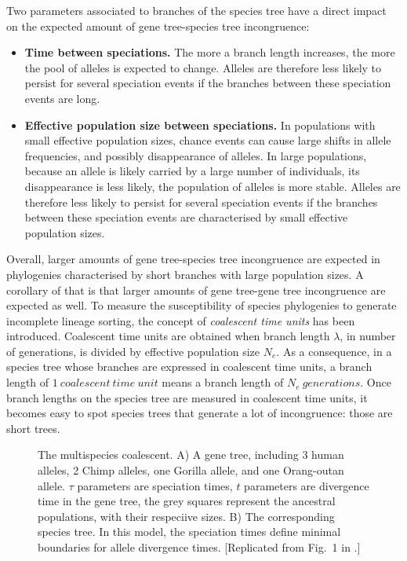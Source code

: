 Two parameters associated to branches of the species tree have a direct impact on the expected amount of gene tree-species tree incongruence:
\begin{itemize}
\item \textbf{Time between speciations.} The more a branch length increases, the more the pool of alleles is expected to change.
Alleles are therefore less likely to persist for several speciation events if the branches between these speciation events are long.
\item \textbf{Effective population size between speciations.} In populations with small effective population sizes, chance events can cause large shifts in allele frequencies, and possibly disappearance of alleles. 
In large populations, because an allele is likely carried by a large number of individuals, its disappearance is less likely, the population of alleles is more stable.
Alleles are therefore less likely to persist for several speciation events if the branches between these speciation events are characterised by small effective population sizes.
\end{itemize}
Overall, larger amounts of gene tree-species tree incongruence are expected in phylogenies characterised by short branches with large population sizes. 
A corollary of that is that larger amounts of gene tree-gene tree incongruence are expected as well. 
To measure the susceptibility of species phylogenies to generate incomplete lineage sorting, the concept of \emph{coalescent time units} has been introduced.
Coalescent time units are obtained when branch length $\lambda$, in number of generations, is divided by effective population size $N_e$.
As a consequence, in a species tree whose branches are expressed in coalescent time units, a branch length of $1~coalescent~time~unit $ means a branch length of $N_e~generations$. 
Once branch lengths on the species tree are measured in coalescent time units, it becomes easy to spot species trees that generate a lot of incongruence: those are short trees.

\begin{figure}[h!]
\centering
{}
\caption{\small The multispecies coalescent. A) A gene tree, including 3 human alleles, 2 Chimp alleles, one Gorilla allele, and one Orang-outan allele. $\tau$ parameters are speciation times, $t$ parameters are divergence time in the gene tree, the grey squares represent the ancestral populations, with their respeciive sizes.  B) The corresponding species tree. In this model, the speciation times define minimal boundaries for allele divergence times. [Replicated from Fig.~1 in \citet{Rannala2003a}.]}
\label{fig2}
\end{figure}


